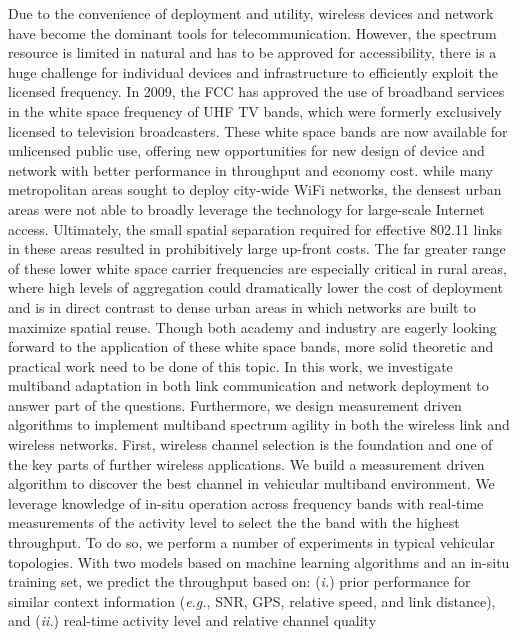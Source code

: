 Due to the convenience of deployment and utility, wireless devices and network
have become the dominant tools for telecommunication. However, the spectrum resource
is limited in natural and has to be approved for accessibility, there is a huge 
challenge for individual devices and infrastructure to efficiently exploit the 
licensed frequency. In 2009, the FCC has approved the use of broadband services 
in the white space frequency of UHF TV bands, which were formerly exclusively 
licensed to television broadcasters. These white space bands are now available 
for unlicensed public use, offering new opportunities for new design of device 
and network with better performance in throughput and economy cost. while many 
metropolitan areas sought to deploy city-wide WiFi networks, the densest urban 
areas were not able to broadly leverage the technology for large-scale Internet 
access.  Ultimately, the small spatial separation required for effective 802.11 
links in these areas resulted in prohibitively large up-front costs. The far 
greater range of these lower white space carrier frequencies are especially 
critical in rural areas, where high levels of aggregation could dramatically 
lower the cost of deployment and is in direct contrast to dense urban areas in 
which networks are built to maximize spatial reuse. Though both academy and 
industry are eagerly looking forward to the application of these white space 
bands, more solid theoretic and practical work need to be done of this topic. 
In this work, we investigate multiband adaptation in both link communication 
and network deployment to answer part of the questions. Furthermore, we design 
measurement driven algorithms to implement multiband spectrum agility in both 
the wireless link and wireless networks.
First, wireless channel selection is the foundation and one of the key parts 
of further wireless applications. We build a measurement driven algorithm 
to discover the best channel in vehicular multiband environment. We leverage 
knowledge of in-situ operation across frequency bands with real-time measurements 
of the activity level to select the the band with the highest throughput. To 
do so, we perform a number of experiments in typical vehicular topologies. 
With two models based on machine learning algorithms and an in-situ training 
set, we predict the throughput based on: ({\it i.}) prior performance for 
similar context information ({\it e.g.}, SNR, GPS, relative speed, and link 
distance), and ({\it ii.}) real-time activity level and relative channel quality 

